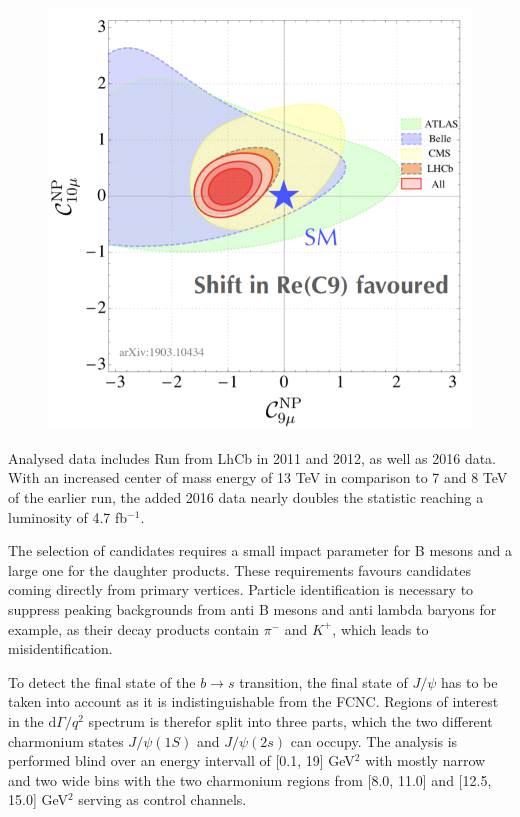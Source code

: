\documentclass[%
 reprint,
 amsmath,amssymb,
 aps,
]{revtex4-2}
\begin{document}
\begin{figure}[b]
\includegraphics{shift}
\caption{\label{fig:shift}}
\end{figure}


Analysed data includes Run from LhCb in 2011 and 2012, as well as 2016 data. With an increased center of mass energy of 13 TeV in
comparison to 7 and 8 TeV of the earlier run, the added 2016 data nearly doubles the statistic reaching a
luminosity of 4.7 fb$^{-1}$.

The selection of candidates requires a small impact parameter for B mesons and a large one for the daughter products. These
requirements favours candidates coming directly from primary vertices. Particle identification is necessary to suppress peaking
backgrounds from anti B mesons and anti lambda baryons for example, as their decay products contain $\pi^-$ and $K^+$, which
leads to misidentification.

To detect the final state of the $b \longrightarrow s$ transition, the final state of $J/\psi$ has to be taken into account as
it is indistinguishable from the FCNC. Regions of interest in the $\text{d}\Gamma/q^2$ spectrum is therefor split
into three parts, which the two different charmonium states $J/\psi(1S)$ and $J/\psi(2s)$ can occupy.
The analysis is performed blind over an energy intervall of [0.1, 19] GeV$^2$ with mostly narrow and two wide bins with
the two charmonium regions from [8.0, 11.0] and [12.5, 15.0] GeV$^2$ serving as control channels.





\end{document}
